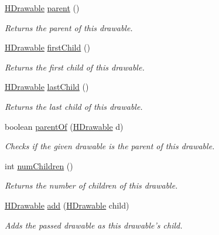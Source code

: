 \begin{DoxyCompactItemize}
\item 
\hyperlink{classhype_1_1drawable_1_1_h_drawable}{H\-Drawable} \hyperlink{classhype_1_1drawable_1_1_h_drawable_a8727cdaaf42b1a6fe73179a1c8422f74}{parent} ()
\begin{DoxyCompactList}\small\item\em Returns the parent of this drawable. \end{DoxyCompactList}\item 
\hyperlink{classhype_1_1drawable_1_1_h_drawable}{H\-Drawable} \hyperlink{classhype_1_1drawable_1_1_h_drawable_a3e5cc588f5e3c3357ca5db38f969af3e}{first\-Child} ()
\begin{DoxyCompactList}\small\item\em Returns the first child of this drawable. \end{DoxyCompactList}\item 
\hyperlink{classhype_1_1drawable_1_1_h_drawable}{H\-Drawable} \hyperlink{classhype_1_1drawable_1_1_h_drawable_a1e774c59f6138a2e6c97a0de05360605}{last\-Child} ()
\begin{DoxyCompactList}\small\item\em Returns the last child of this drawable. \end{DoxyCompactList}\item 
boolean \hyperlink{classhype_1_1drawable_1_1_h_drawable_a87eb6c528352be66025c99b96ac15aca}{parent\-Of} (\hyperlink{classhype_1_1drawable_1_1_h_drawable}{H\-Drawable} d)
\begin{DoxyCompactList}\small\item\em Checks if the given drawable is the parent of this drawable. \end{DoxyCompactList}\item 
int \hyperlink{classhype_1_1drawable_1_1_h_drawable_a360bca8862db709ae7262a1b56b14dfa}{num\-Children} ()
\begin{DoxyCompactList}\small\item\em Returns the number of children of this drawable. \end{DoxyCompactList}\item 
\hyperlink{classhype_1_1drawable_1_1_h_drawable}{H\-Drawable} \hyperlink{classhype_1_1drawable_1_1_h_drawable_a16ab471c94dacec871e49c0b9e4e5138}{add} (\hyperlink{classhype_1_1drawable_1_1_h_drawable}{H\-Drawable} child)
\begin{DoxyCompactList}\small\item\em Adds the passed drawable as this drawable's child. \end{DoxyCompactList}\item 

\end{DoxyCompactItemize}
